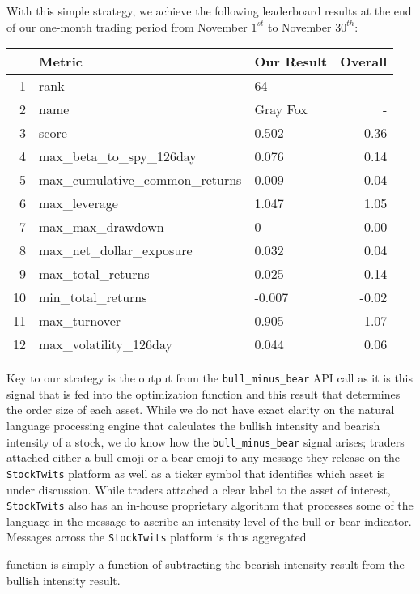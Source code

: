 \documentclass[11pt,]{article}
\begin{document}
With this simple strategy, we achieve the following leaderboard results
at the end of our one-month trading period from November \(1^{st}\) to
November \(30^{th}\):

\begin{table}[ht]
\centering
\begin{tabular}{rllr}
  \hline
 & Metric & Our Result & Overall \\ 
  \hline
1 & rank & 64 & - \\ 
  2 & name & Gray Fox & - \\ 
  3 & score & 0.502 & 0.36 \\ 
  4 & max\_beta\_to\_spy\_126day & 0.076 & 0.14 \\ 
  5 & max\_cumulative\_common\_returns & 0.009 & 0.04 \\ 
  6 & max\_leverage & 1.047 & 1.05 \\ 
  7 & max\_max\_drawdown & 0 & -0.00 \\ 
  8 & max\_net\_dollar\_exposure & 0.032 & 0.04 \\ 
  9 & max\_total\_returns & 0.025 & 0.14 \\ 
  10 & min\_total\_returns & -0.007 & -0.02 \\ 
  11 & max\_turnover & 0.905 & 1.07 \\ 
  12 & max\_volatility\_126day & 0.044 & 0.06 \\ 
   \hline
\end{tabular}
\end{table}

Key to our strategy is the output from the \texttt{bull\_minus\_bear}
API call as it is this signal that is fed into the optimization function
and this result that determines the order size of each asset. While we
do not have exact clarity on the natural language processing engine that
calculates the bullish intensity and bearish intensity of a stock, we do
know how the \texttt{bull\_minus\_bear} signal arises; traders attached
either a bull emoji or a bear emoji to any message they release on the
\texttt{StockTwits} platform as well as a ticker symbol that identifies
which asset is under discussion. While traders attached a clear label to
the asset of interest, \texttt{StockTwits} also has an in-house
proprietary algorithm that processes some of the language in the message
to ascribe an intensity level of the bull or bear indicator. Messages
across the \texttt{StockTwits} platform is thus aggregated

function is simply a function of subtracting the bearish intensity
result from the bullish intensity result.
\end{document}
